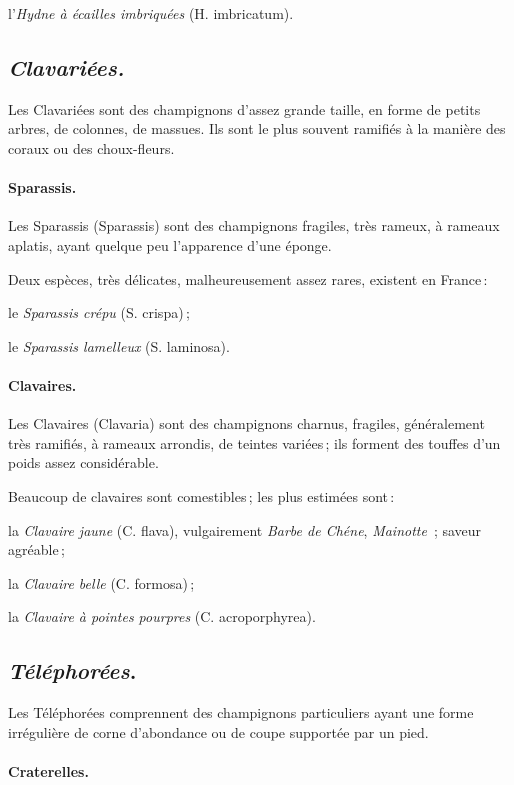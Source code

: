 l'\textit{Hydne à écailles imbriquées} (H. imbricatum).

\subsection*{\centering \textit{Clavariées.}} 

Les Clavariées sont des champignons d'assez grande taille, en forme de petits
arbres, de colonnes, de massues. Ils sont le plus souvent ramifiés à la manière
des coraux ou des choux-fleurs.

\paragraph{Sparassis.}

Les Sparassis (Sparassis) sont des champignons fragiles, très rameux, à rameaux
aplatis, ayant quelque peu l'apparence d'une éponge.

Deux espèces, très délicates, malheureusement assez rares, existent en France :

le \textit{Sparassis crépu} (S. crispa) ;

le \textit{Sparassis lamelleux} (S. laminosa).

\paragraph{Clavaires.}

Les Clavaires (Clavaria) sont des champignons charnus, fragiles, généralement
très ramifiés, à rameaux arrondis, de teintes variées ; ils forment des touffes
d’un poids assez considérable.

Beaucoup de clavaires sont comestibles ; les plus estimées sont :

la \textit{Clavaire jaune} (C. flava), vulgairement \textit{Barbe de Chéne},
\textit{Mainotte}  ; saveur agréable ;

la \textit{Clavaire belle} (C. formosa) ;

la \textit{Clavaire à pointes pourpres} (C. acroporphyrea).

\subsection*{\centering \textit{Téléphorées}.}

Les Téléphorées comprennent des champignons particuliers ayant une forme
irrégulière de corne d'abondance ou de coupe supportée par un pied.

\paragraph{Craterelles.}

